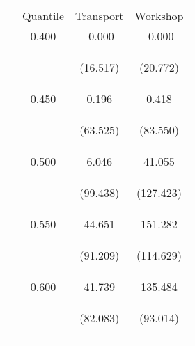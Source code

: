 \begin{tabular}{lccc}
\hline \noalign{\smallskip} & Quantile & Transport & Workshop\\
\noalign{\smallskip}\hline \noalign{\smallskip} & 0.400 & -0.000 & -0.000\\
 & \begin{footnotesize}\end{footnotesize} & \begin{footnotesize}(16.517)\end{footnotesize} & \begin{footnotesize}(20.772)\end{footnotesize}\\
\noalign{\smallskip} & 0.450 & 0.196 & 0.418\\
 & \begin{footnotesize}\end{footnotesize} & \begin{footnotesize}(63.525)\end{footnotesize} & \begin{footnotesize}(83.550)\end{footnotesize}\\
\noalign{\smallskip} & 0.500 & 6.046 & 41.055\\
 & \begin{footnotesize}\end{footnotesize} & \begin{footnotesize}(99.438)\end{footnotesize} & \begin{footnotesize}(127.423)\end{footnotesize}\\
\noalign{\smallskip} & 0.550 & 44.651 & 151.282\\
 & \begin{footnotesize}\end{footnotesize} & \begin{footnotesize}(91.209)\end{footnotesize} & \begin{footnotesize}(114.629)\end{footnotesize}\\
\noalign{\smallskip} & 0.600 & 41.739 & 135.484\\
 & \begin{footnotesize}\end{footnotesize} & \begin{footnotesize}(82.083)\end{footnotesize} & \begin{footnotesize}(93.014)\end{footnotesize}\\

\end{tabular}
